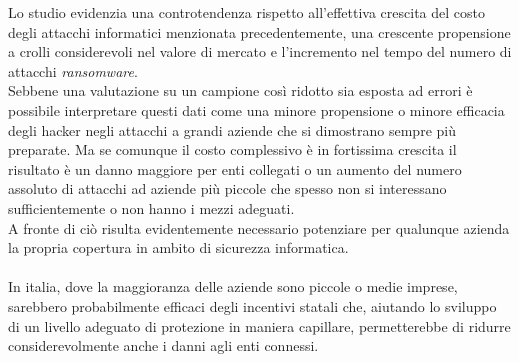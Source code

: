 \documentclass[12pt,a4paper,openright,twoside]{report}
\begin{document}
Lo studio evidenzia una controtendenza rispetto all'effettiva crescita del 
costo degli attacchi informatici menzionata precedentemente, una crescente 
propensione a crolli considerevoli nel valore di mercato e l'incremento
nel tempo del numero di attacchi \textit{ransomware}.\\
Sebbene una valutazione su un campione cos\`i ridotto sia esposta ad errori
\`e possibile interpretare questi dati come una minore propensione o 
minore efficacia degli hacker negli attacchi a grandi aziende che si
dimostrano sempre pi\`u preparate. Ma se comunque il costo complessivo 
\`e in fortissima crescita \cite{cybercrime_magazine} il risultato \`e 
un danno maggiore per enti collegati o un aumento del numero assoluto di
attacchi ad aziende pi\`u piccole che spesso non si interessano sufficientemente
 o non hanno i mezzi adeguati.\\
A fronte di ci\`o risulta evidentemente necessario potenziare per qualunque
azienda la propria copertura in ambito di sicurezza informatica.\\
\\
In italia, dove la maggioranza delle aziende sono piccole o medie imprese, 
sarebbero probabilmente efficaci degli incentivi statali che, aiutando lo 
sviluppo di un livello adeguato di protezione in maniera capillare,
permetterebbe di ridurre considerevolmente anche i danni agli enti connessi.


\clearpage{\pagestyle{empty}\cleardoublepage}



\label{Bibliography}


\end{document}
